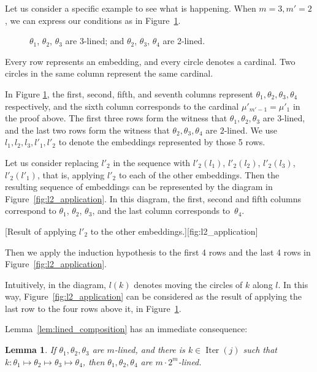 \documentclass{article}
\newtheorem{lemma}{Lemma}[section]
\theoremstyle{definition}
\theoremstyle{remark}
\DeclareMathOperator{\Iter}{Iter}
\begin{document}
Let us consider a specific example to see what is happening. When $m=3,m'=2$, we can express our conditions as in Figure~\ref{fig:123-3-lined_234-2-lined}.


  \begin{figure}[htpb]
  \centering
    \caption{$\theta_1$, $\theta_2$, $\theta_3$ are 3-lined; and $\theta_2$, $\theta_3$, $\theta_4$ are 2-lined.}
    \label{fig:123-3-lined_234-2-lined}
  \end{figure}


Every row represents an embedding, and every circle denotes a cardinal. Two circles in the same column represent the same cardinal. 

In Figure \ref{fig:123-3-lined_234-2-lined}, the first, second, fifth, and seventh columns represent $\theta_1,\theta_2,\theta_3,\theta_4$ respectively, and the sixth column corresponds to the cardinal $\mu'_{m'-1}= \mu'_1$ in the proof above. The first three rows form the witness that $\theta_1,\theta_2,\theta_3$ are $3$-lined, and the last two rows form the witness that $\theta_2,\theta_3,\theta_4$ are $2$-lined. We use $l_1,l_2,l_3,l'_1,l'_2$ to denote the embeddings represented by those 5 rows.

Let us consider replacing $l'_2$ in the sequence with $l'_2(l_1)$, $l'_2(l_2)$, $l'_2(l_3)$, $l'_2(l'_1)$, that is, applying $l'_2$ to each of the other embeddings. Then the resulting sequence of embeddings can be represented by the diagram in Figure~\ref{fig:l2_application}. In this diagram, the first, second and fifth columns correspond to $\theta_1$, $\theta_2$, $\theta_3$, and the last column corresponds to~$\theta_4$. 

[Result of applying $l'_2$ to the other embeddings.][fig:l2_application]

Then we apply the induction hypothesis to the first 4 rows and the last 4 rows in Figure~\ref{fig:l2_application}.

Intuitively, in the diagram, $l(k)$ denotes moving the circles of $k$ along $l$. In this way, Figure~\ref{fig:l2_application} can be considered as the result of applying the last row to the four rows above it, in Figure~\ref{fig:123-3-lined_234-2-lined}.

Lemma~\ref{lem:lined_composition} has an immediate consequence:

\begin{lemma}
\label{aaab}
  If $\theta_1,\theta_2,\theta_3$ are $m$-lined, and there is $k\in \Iter(j)$ such that $k:\theta_1\mapsto\theta_2\mapsto\theta_3\mapsto\theta_4$, then $\theta_1,\theta_2,\theta_4$ are $m\cdot 2^m$-lined.
\end{lemma}
\end{document}
